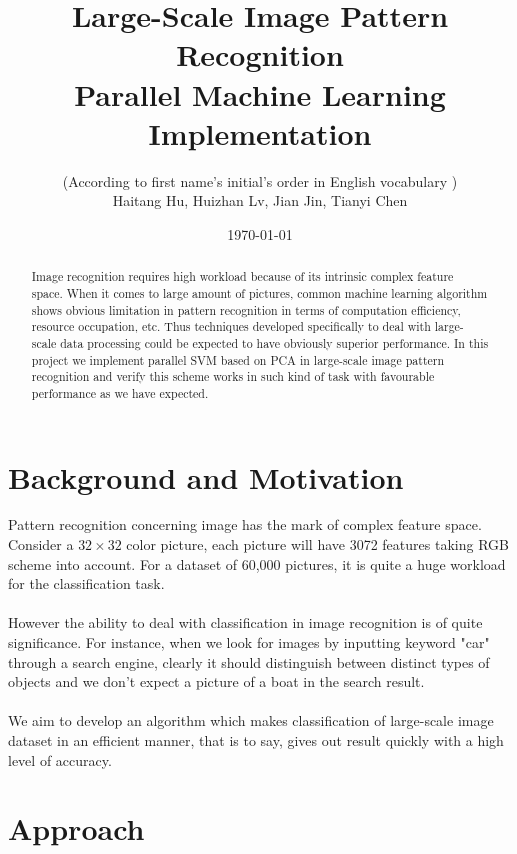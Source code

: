 \documentclass[a4paper]{article}
\title{Large-Scale Image Pattern Recognition\\
Parallel Machine Learning Implementation}
\author{(According to first name's initial's order in English vocabulary )\\
Haitang Hu, Huizhan Lv, Jian Jin, Tianyi Chen}
\date{\today}
\begin{document}
\maketitle

\begin{abstract}
Image recognition requires high workload because of its intrinsic complex feature space. When it comes to large amount of pictures, common machine learning algorithm shows obvious limitation in pattern recognition in terms of computation efficiency, resource occupation, etc. Thus techniques developed specifically to deal with large-scale data processing could be expected to have obviously superior performance. In this project we implement parallel SVM based on PCA in large-scale image pattern recognition and verify this scheme works in such kind of task with favourable performance as we have expected. 
\end{abstract}

\section{Background and Motivation}
Pattern recognition concerning image has the mark of complex feature space. Consider a $32\times 32$ color picture, each picture will have 3072 features taking RGB scheme into account. For a dataset of 60,000 pictures, it is quite a huge workload for the classification task.\\
\\
However the ability to deal with classification in image recognition is of quite significance. For instance, when we  look for images by inputting keyword "car" through a search engine, clearly it should distinguish between distinct types of objects and we don't expect a picture of a boat in the search result.\\
\\
We aim to develop an algorithm which makes classification of large-scale image dataset in an efficient manner, that is to say, gives out result quickly with a high level of accuracy. 
\section{Approach}
\end{document}
